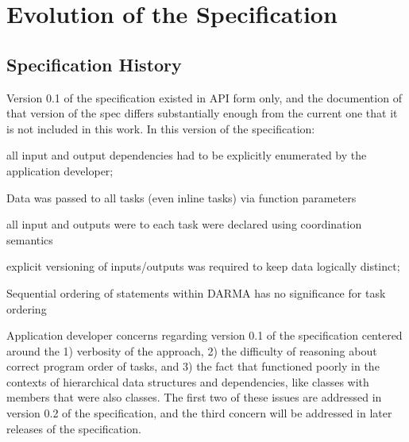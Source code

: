 
\chapter{Evolution of the Specification}
\label{chap:evolution}
\section{Specification History}
\label{sec:past}
Version 0.1 of the specification existed in \gls{API} form only, and
the documention of that version of the spec differs substantially
enough from the current one that it is not included in this work.
In this version of the specification:
\begin{compactenum}
\item all input and output dependencies had to be explicitly enumerated by the application
developer;
\item Data was passed to all tasks (even inline tasks) via function parameters
\item all input and outputs were to each task were declared using \gls{coordination semantics}
\item explicit versioning of inputs/outputs was required to keep data
logically distinct;
\item Sequential ordering of statements within DARMA has no significance for task ordering
\end{compactenum}

 Application developer concerns regarding version 0.1 of the specification
 centered around the 1) verbosity of the approach, 2) the difficulty of
 reasoning about correct program order of tasks, and 3) the fact that 
  functioned poorly in the contexts of hierarchical data
 structures and dependencies, like classes with members that were also
 classes.  The first two of these issues are addressed in version 0.2 of the
 specification, and the third concern will be addressed in later releases of the specification.
   



